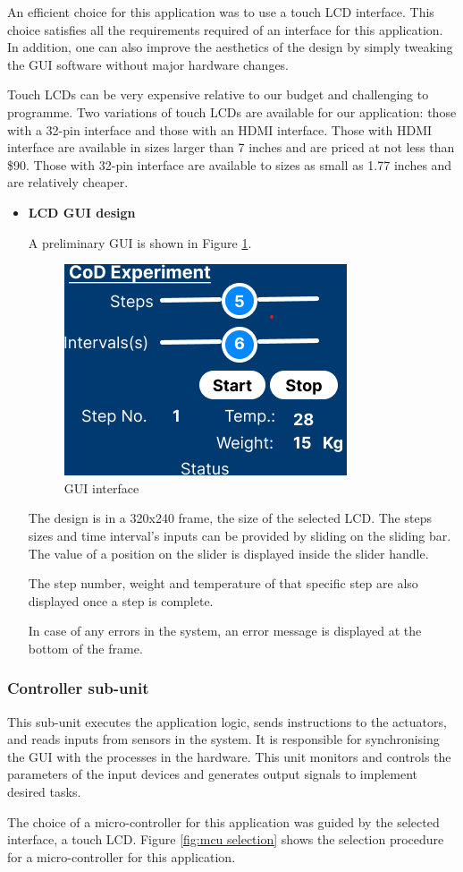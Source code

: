  An efficient choice for this application was to use a touch LCD interface. This choice satisfies all the requirements required of an interface for this application. In addition, one can also improve the aesthetics of the design by simply tweaking the GUI software without major hardware changes.
 \par
 Touch LCDs can be very expensive relative to our budget and challenging to programme. Two variations of touch LCDs are available for our application: those with a 32-pin interface and those with an HDMI interface. Those with HDMI interface are available in sizes larger than 7 inches and are priced at not less than \$90. Those with 32-pin interface are available to sizes as small as 1.77 inches and are relatively cheaper.    
\begin{itemize}
    \item \textbf{LCD GUI design}
    \par
    A preliminary GUI is shown in Figure \ref{fig:GUI_interface}.
    \begin{figure}[H]
        \centering
        \includegraphics{Figures/interfacedesign.png}
        \caption{GUI interface}
        \label{fig:GUI_interface}
    \end{figure}
    The design is in a 320x240 frame, the size of the selected LCD. The steps sizes and time interval's inputs can be provided by sliding on the sliding bar. The value of a position on the slider is displayed inside the slider handle.
    \par
    The step number, weight and temperature of that specific step are also displayed once a step is complete.
    \par
    In case of any errors in the system, an error message is displayed at the bottom of the frame.
\end{itemize}

\subsubsection{Controller sub-unit}
This sub-unit executes the application logic, sends instructions to the actuators, and reads inputs from sensors in the system. It is responsible for synchronising the GUI with the processes in the hardware. This unit monitors and controls the parameters of the input devices and generates output signals to implement desired tasks.
\par
The choice of a micro-controller for this application was guided by the selected interface, a touch LCD. Figure \ref{fig:mcu selection} shows the selection procedure for a micro-controller for this application.

